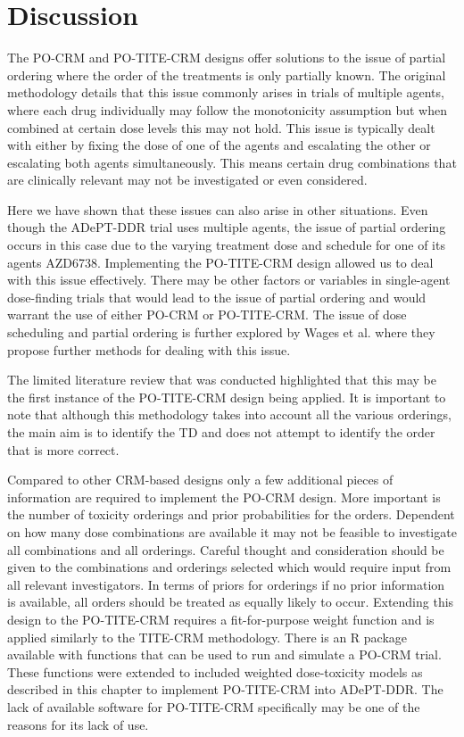 \section{Discussion}  
\label{adept:Discussion}

The PO-CRM and PO-TITE-CRM designs offer solutions to the issue of partial ordering where the order of the treatments is only partially known. The original methodology details that this issue commonly arises in trials of multiple agents, where each drug individually may follow the monotonicity assumption but when combined at certain dose levels this may not hold. This issue is typically dealt with either by fixing the dose of one of the agents and escalating the other or escalating both agents simultaneously. This means certain drug combinations that are clinically relevant may not be investigated or even considered.  
 
Here we have shown that these issues can also arise in other situations. Even though the ADePT-DDR trial uses multiple agents, the issue of partial ordering occurs in this case due to the varying treatment dose and schedule for one of its agents AZD6738. Implementing the PO-TITE-CRM design allowed us to deal with this issue effectively. There may be other factors or variables in single-agent dose-finding trials that would lead to the issue of partial ordering and would warrant the use of either PO-CRM or PO-TITE-CRM. The issue of dose scheduling and partial ordering is further explored by Wages et al. \cite{wagesPhaseDesignCompletely2014} where they propose further methods for dealing with this issue. 

The limited literature review that was conducted highlighted that this may be the first instance of the PO-TITE-CRM design being applied. It is important to note that although this methodology takes into account all the various orderings, the main aim is to identify the TD and does not attempt to identify the order that is more correct. 

Compared to other CRM-based designs only a few additional pieces of information are required to implement the PO-CRM design. More important is the number of toxicity orderings and prior probabilities for the orders. Dependent on how many dose combinations are available it may not be feasible to investigate all combinations and all orderings. Careful thought and consideration should be given to the combinations and orderings selected which would require input from all relevant investigators. In terms of priors for orderings if no prior information is available, all orders should be treated as equally likely to occur. Extending this design to the PO-TITE-CRM requires a fit-for-purpose weight function and is applied similarly to the TITE-CRM methodology. There is an R package available with functions that can be used to run and simulate a PO-CRM trial. These functions were extended to included weighted dose-toxicity models as described in this chapter to implement PO-TITE-CRM into ADePT-DDR. The lack of available software for PO-TITE-CRM specifically may be one of the reasons for its lack of use.

